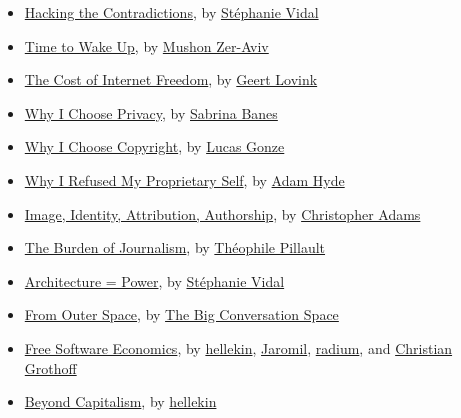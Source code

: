 \begin{itemize}
\tightlist
\item
  \href{hacking-the-contradictions.html}{Hacking the Contradictions}, by
  \href{../appendix/attributions.html\#stephanie-vidal}{Stéphanie Vidal}
\item
  \href{time-to-wake-up.html}{Time to Wake Up}, by
  \href{../appendix/attributions.html\#mushon-zer-aviv}{Mushon Zer-Aviv}
\item
  \href{the-cost-of-internet-freedom.html}{The Cost of Internet
  Freedom}, by \href{../appendix/attributions.html\#geert-lovink}{Geert
  Lovink}
\item
  \href{why-i-choose-privacy.html}{Why I Choose Privacy}, by
  \href{../appendix/attributions.html\#sabrina-banes}{Sabrina Banes}
\item
  \href{why-i-choose-copyright.html}{Why I Choose Copyright}, by
  \href{../appendix/attributions.html\#lucas-gonze}{Lucas Gonze}
\item
  \href{why-i-refused-my-proprietary-self.html}{Why I Refused My
  Proprietary Self}, by
  \href{../appendix/attributions.html\#adam-hyde}{Adam Hyde}
\item
  \href{image-identity-attribution-authorship.html}{Image, Identity,
  Attribution, Authorship}, by
  \href{../appendix/attributions.html\#christopher-adams}{Christopher
  Adams}
\item
  \href{the-burden-of-journalism.html}{The Burden of Journalism}, by
  \href{../appendix/attributions.html\#theophile-pillault}{Théophile
  Pillault}
\item
  \href{architecture=power.html}{Architecture = Power}, by
  \href{../appendix/attributions.html\#stephanie-vidal}{Stéphanie Vidal}
\item
  \href{from-outer-space.html}{From Outer Space}, by
  \href{../appendix/attributions.html\#the-big-conversation-space}{The
  Big Conversation Space}
\item
  \href{free-software-economics.html}{Free Software Economics}, by
  \href{../appendix/attributions.html\#hellekin}{hellekin},
  \href{../appendix/attributions.html\#jaromil}{Jaromil},
  \href{../appendix/attributions.html\#radium}{radium}, and
  \href{../appendix/attributions.html\#christian-grothoff}{Christian
  Grothoff}
\item
  \href{beyond-capitalism.html}{Beyond Capitalism}, by
  \href{../appendix/attributions.html\#hellekin}{hellekin}
\end{itemize}
